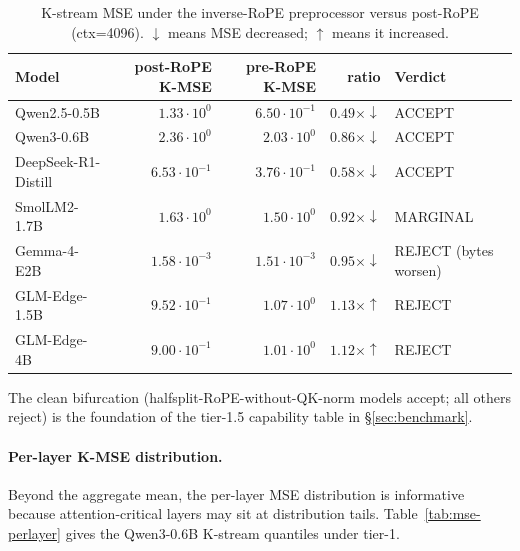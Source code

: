 \documentclass[11pt,a4paper]{article}
\theoremstyle{definition}
\theoremstyle{plain}
\begin{document}
\begin{table}[H]
\centering
\small
\caption{K-stream MSE under the inverse-RoPE preprocessor versus post-RoPE (ctx=4096). $\downarrow$ means MSE decreased; $\uparrow$ means it increased.}
\label{tab:mse-rope}
\begin{tabular}{lrrrl}
  \toprule
  Model & post-RoPE K-MSE & pre-RoPE K-MSE & ratio & Verdict \\
  \midrule
  Qwen2.5-0.5B                  & $1.33\!\cdot\!10^{0}$  & $6.50\!\cdot\!10^{-1}$ & $0.49\times\downarrow$  & ACCEPT \\
  Qwen3-0.6B                    & $2.36\!\cdot\!10^{0}$  & $2.03\!\cdot\!10^{0}$  & $0.86\times\downarrow$  & ACCEPT \\
  DeepSeek-R1-Distill           & $6.53\!\cdot\!10^{-1}$ & $3.76\!\cdot\!10^{-1}$ & $0.58\times\downarrow$  & ACCEPT \\
  SmolLM2-1.7B                  & $1.63\!\cdot\!10^{0}$  & $1.50\!\cdot\!10^{0}$  & $0.92\times\downarrow$  & MARGINAL \\
  Gemma-4-E2B                   & $1.58\!\cdot\!10^{-3}$ & $1.51\!\cdot\!10^{-3}$ & $0.95\times\downarrow$  & REJECT (bytes worsen) \\
  GLM-Edge-1.5B                 & $9.52\!\cdot\!10^{-1}$ & $1.07\!\cdot\!10^{0}$  & $1.13\times\uparrow$    & REJECT \\
  GLM-Edge-4B                   & $9.00\!\cdot\!10^{-1}$ & $1.01\!\cdot\!10^{0}$  & $1.12\times\uparrow$    & REJECT \\
  \bottomrule
\end{tabular}
\end{table}

The clean bifurcation (halfsplit-RoPE-without-QK-norm models accept; all others reject) is the foundation of the tier-1.5 capability table in \S\ref{sec:benchmark}.

\paragraph{Per-layer K-MSE distribution.}
Beyond the aggregate mean, the per-layer MSE distribution is informative because attention-critical layers may sit at distribution tails. Table~\ref{tab:mse-perlayer} gives the Qwen3-0.6B K-stream quantiles under tier-1.
\end{document}

